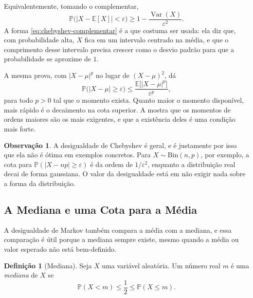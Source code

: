 \documentclass[12pt,portuguese]{article}
\theoremstyle{definition}
\newtheorem{definition}[definition]{Definição}
\newtheorem{remark}[remark]{Observação}
\theoremstyle{plainexercise}
\theoremstyle{starredexercise}
\theoremstyle{definition}
\begin{document}
Equivalentemente, tomando o complementar,
\begin{equation}\label{eq:chebyshev-complementar}
\mathbb{P}\bigl(|X-\mathbb{E}[X]|<\varepsilon\bigr)
\geqslant
1-\frac{\operatorname{Var}(X)}{\varepsilon^2}.
\end{equation}
A forma \eqref{eq:chebyshev-complementar} é a que costuma ser usada: ela diz
que, com probabilidade alta, $X$ fica em um intervalo centrado na média, e que
o comprimento desse intervalo precisa crescer como o desvio padrão para que a
probabilidade se aproxime de $1$.

A mesma prova, com $|X-\mu|^p$ no lugar de $(X-\mu)^2$, dá
\[
\mathbb{P}\bigl(|X-\mu|\geqslant\varepsilon\bigr)
\leqslant
\frac{\mathbb{E}\bigl[|X-\mu|^p\bigr]}{\varepsilon^p},
\]
para todo $p>0$ tal que o momento exista. Quanto maior o momento disponível,
mais rápido é o decaimento na cota superior. A  mostra que os momentos
de ordens maiores são os mais exigentes, e que a existência deles é uma
condição mais forte.

\begin{remark}\label{rem:chebyshev-nao-e-otima}
A desigualdade de Chebyshev é geral, e é justamente por isso que ela não é
ótima em exemplos concretos. Para $X\sim\mathrm{Bin}(n,p)$, por exemplo, a cota
para $\mathbb{P}(|X-np|\geqslant\varepsilon)$ é da ordem de $1/\varepsilon^2$,
enquanto a distribuição real decai de forma gaussiana. O valor da desigualdade
está em não exigir nada sobre a forma da distribuição.
\end{remark}

\subsection{A Mediana e uma Cota para a Média}\label{subsec:mediana}

A desigualdade de Markov também compara a média com a mediana, e essa
comparação é útil porque a mediana sempre existe, mesmo quando a média ou valor
esperado não está bem-definido.

\begin{definition}[Mediana]\label{def:mediana}
Seja $X$ uma variável aleatória. Um número real $m$ é uma \emph{mediana} de
$X$ se
\[
\mathbb{P}(X<m)\leqslant\frac{1}{2}\leqslant\mathbb{P}(X\leqslant m).
\]
\end{definition}
\end{document}
